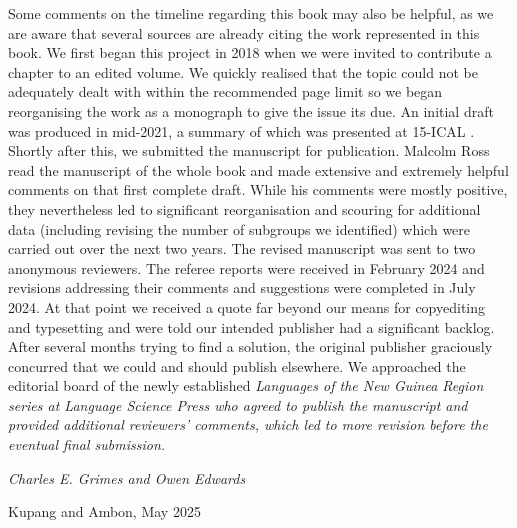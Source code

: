 Some comments on the timeline regarding this book may also be helpful,
as we are aware that several sources are already citing the work represented in this book.
We first began this project in 2018 when we were invited to contribute a chapter to an edited volume.
We quickly realised that the topic could not be adequately dealt with within the recommended
page limit so we began reorganising the work as a monograph to give the issue its due.
An initial draft was produced in mid-2021,
a summary of which was presented at 15-ICAL \citep{EdwardsGrimes2021}.
Shortly after this, we submitted the manuscript for publication.
Malcolm Ross read the manuscript of the whole book and made extensive
and extremely helpful comments on that first complete draft.
While his comments were mostly positive, they nevertheless
led to significant reorganisation
and scouring for additional data
(including revising the number of subgroups we identified)
which were carried out over the next two years.
The revised manuscript was sent to two anonymous reviewers.
The referee reports were received in February 2024 and revisions
addressing their comments and suggestions were completed in July 2024.
At that point we received a quote far beyond our means for copyediting and typesetting
and were told our intended publisher had a significant backlog.
After several months trying to find a solution,
the original publisher graciously concurred
that we could and should publish elsewhere.
We approached the editorial board of the newly
established \it{Languages of the New Guinea Region}
series at Language Science Press who agreed to publish
the manuscript and provided additional reviewers' comments,
which led to more revision before the eventual final submission.

\begin{flushright}
\it{Charles E. Grimes and Owen Edwards}

Kupang and Ambon, May 2025
\end{flushright}
